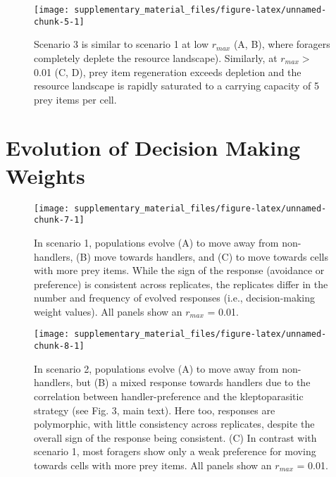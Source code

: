\documentclass[
]{scrreprt}
\begin{document}
\begin{figure}

{\centering \texttt{[image: supplementary\_material\_files/figure-latex/unnamed-chunk-5-1]} 

}

\caption{Scenario 3 is similar to scenario 1 at low $r_{max}$ (A, B), where foragers completely deplete the resource landscape). Similarly, at $r_{max} >$ 0.01 (C, D), prey item regeneration exceeds depletion and the resource landscape is rapidly saturated to a carrying capacity of 5 prey items per cell.}\label{fig:unnamed-chunk-5}
\end{figure}

\hypertarget{evolution-of-decision-making-weights}{%
\chapter{Evolution of Decision Making Weights}\label{evolution-of-decision-making-weights}}

\begin{figure}

{\centering \texttt{[image: supplementary\_material\_files/figure-latex/unnamed-chunk-7-1]} 

}

\caption{In scenario 1, populations evolve (A) to move away from non-handlers, (B) move towards handlers, and (C) to move towards cells with more prey items. While the sign of the response (avoidance or preference) is consistent across replicates, the replicates differ in the number and frequency of evolved responses (i.e., decision-making weight values). All panels show an $r_{max}$ = 0.01.}\label{fig:unnamed-chunk-7}
\end{figure}

\begin{figure}

{\centering \texttt{[image: supplementary\_material\_files/figure-latex/unnamed-chunk-8-1]} 

}

\caption{In scenario 2, populations evolve (A) to move away from non-handlers, but (B) a mixed response towards handlers due to the correlation between handler-preference and the kleptoparasitic strategy (see Fig. 3, main text). Here too, responses are polymorphic, with little consistency across replicates, despite the overall sign of the response being consistent. (C) In contrast with scenario 1, most foragers show only a weak preference for moving towards cells with more prey items. All panels show an $r_{max}$ = 0.01.}\label{fig:unnamed-chunk-8}
\end{figure}
\end{document}
